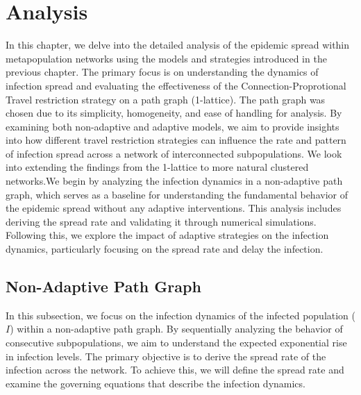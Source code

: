 % 

\section{Analysis}

In this chapter, we delve into the detailed analysis of the epidemic spread within metapopulation networks using the models and strategies introduced in the previous chapter. The primary focus is on understanding the dynamics of infection spread and evaluating the effectiveness of the Connection-Proprotional Travel restriction strategy on a path graph (1-lattice). The path graph was chosen due to its simplicity, homogeneity, and ease of handling for analysis.  By examining both non-adaptive and adaptive models, we aim to provide insights into how different travel restriction strategies can influence the rate and pattern of infection spread across a network of interconnected subpopulations. We look into extending the findings from the 1-lattice to more natural clustered networks.We begin by analyzing the infection dynamics in a non-adaptive path graph, which serves as a baseline for understanding the fundamental behavior of the epidemic spread without any adaptive interventions. This analysis includes deriving the spread rate and validating it through numerical simulations. Following this, we explore the impact of adaptive strategies on the infection dynamics, particularly focusing on the spread rate and delay the infection.

\subsection{Non-Adaptive Path Graph}
In this subsection, we focus on the infection dynamics of the infected population ($I$) within a non-adaptive path graph. By sequentially analyzing the behavior of consecutive subpopulations, we aim to understand the expected exponential rise in infection levels. The primary objective is to derive the spread rate of the infection across the network. To achieve this, we will define the spread rate and examine the governing equations that describe the infection dynamics.

